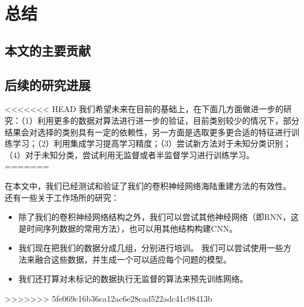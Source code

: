 \chapter{总结}
\section{本文的主要贡献}

\section{后续的研究进展}
<<<<<<< HEAD
我们希望未来在目前的基础上，在下面几方面做进一步的研究：（1）利用更多的数据对算法进行进一步的验证，目前类别较少的情况下，部分结果会对选择的类别具有一定的依赖性，另一方面是选取更多更合适的特征进行训练学习；（2）利用集成学习提高学习精度；（3）尝试新方法对于未知分类识别；（4）对于未知分类，尝试利用无监督或者半监督学习进行训练学习。
=======

在本文中，我们已经测试和验证了我们的卷积神经网络海陆重建方法的有效性。 还有一些关于工作场所的研究：
\begin{itemize}
	\item 除了我们的卷积神经网络结构之外，我们可以尝试其他神经网络（即RNN，这是时间序列数据的常用方法），也可以用其他结构构建CNN。
	\item 我们现在把我们的数据分成几组，分别进行培训。 我们可以尝试使用一些方法来融合这些数据，并生成一个可以适应每个问题的模型。
	\item 我们还打算对未标记的数据执行无监督的算法来预先训练网络。
\end{itemize}
>>>>>>> 5fe069c16b36ca12ac6e28cad522adc41c98413b
